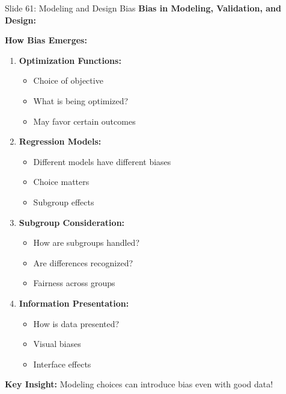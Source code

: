 \documentclass[8pt]{beamer}
\begin{document}
	\begin{frame}{Slide 61: Modeling and Design Bias}
		\fontsize{6.5}{7.5}\selectfont
		\textbf{Bias in Modeling, Validation, and Design:}
		
		\vspace{0.1cm}
		\textbf{How Bias Emerges:}
		\begin{enumerate}
			\item \textbf{Optimization Functions:}
			\begin{itemize}
				\item Choice of objective
				\item What is being optimized?
				\item May favor certain outcomes
			\end{itemize}
			\item \textbf{Regression Models:}
			\begin{itemize}
				\item Different models have different biases
				\item Choice matters
				\item Subgroup effects
			\end{itemize}
			\item \textbf{Subgroup Consideration:}
			\begin{itemize}
				\item How are subgroups handled?
				\item Are differences recognized?
				\item Fairness across groups
			\end{itemize}
			\item \textbf{Information Presentation:}
			\begin{itemize}
				\item How is data presented?
				\item Visual biases
				\item Interface effects
			\end{itemize}
		\end{enumerate}
		
		\textcolor{myblue}{\textbf{Key Insight:}} Modeling choices can \textcolor{myblue}{introduce bias} even with good data!
	\end{frame}
	
\end{document}

